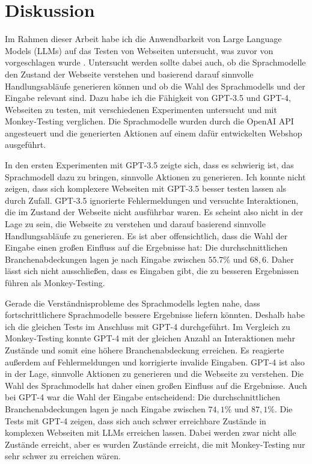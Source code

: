
\chapter{Diskussion}
\label{ch:discussion}

Im Rahmen dieser Arbeit habe ich die Anwendbarkeit von Large Language Models (LLMs) auf das Testen von Webseiten untersucht, was zuvor von \citeauthor{GPT3Testing} vorgeschlagen wurde \cite{GPT3Testing}.
Untersucht werden sollte dabei auch, ob die Sprachmodelle den Zustand der Webseite verstehen und basierend darauf sinnvolle Handlungsabläufe generieren können und ob die Wahl des Sprachmodells und der Eingabe relevant sind.
Dazu habe ich die Fähigkeit von GPT-3.5 und GPT-4, Webseiten zu testen, mit verschiedenen Experimenten untersucht und mit Monkey-Testing verglichen.
Die Sprachmodelle wurden durch die OpenAI API angesteuert und die generierten Aktionen auf einem dafür entwickelten Webshop ausgeführt.

In den ersten Experimenten mit GPT-3.5 zeigte sich, dass es schwierig ist, das Sprachmodell dazu zu bringen, sinnvolle Aktionen zu generieren.
Ich konnte nicht zeigen, dass sich komplexere Webseiten mit GPT-3.5 besser testen lassen als durch Zufall. %
GPT-3.5 ignorierte Fehlermeldungen und versuchte Interaktionen, die im Zustand der Webseite nicht ausführbar waren.
Es scheint also nicht in der Lage zu sein, die Webseite zu verstehen und darauf basierend sinnvolle Handlungsabläufe zu generieren. %
Es ist aber offensichtlich, dass die Wahl der Eingabe einen großen Einfluss auf die Ergebnisse hat: Die durchschnittlichen Branchenabdeckungen lagen je nach Eingabe zwischen $55{.}7\%$ und $68{,}6$. %
Daher lässt sich nicht ausschließen, dass es Eingaben gibt, die zu besseren Ergebnissen führen als Monkey-Testing.

Gerade die Verständnisprobleme des Sprachmodells legten nahe, dass fortschrittlichere Sprachmodelle bessere Ergebnisse liefern könnten.
Deshalb habe ich die gleichen Tests im Anschluss mit GPT-4 durchgeführt.
Im Vergleich zu Monkey-Testing konnte GPT-4 mit der gleichen Anzahl an Interaktionen mehr Zustände und somit eine höhere Branchenabdeckung erreichen. %
Es reagierte außerdem auf Fehlermeldungen und korrigierte invalide Eingaben.
GPT-4 ist also in der Lage, sinnvolle Aktionen zu generieren und die Webseite zu verstehen. %
Die Wahl des Sprachmodells hat daher einen großen Einfluss auf die Ergebnisse. %
Auch bei GPT-4 war die Wahl der Eingabe entscheidend: Die durchschnittlichen Branchenabdeckungen lagen je nach Eingabe zwischen $74{,}1\%$ und $87{,}1\%$. %
Die Tests mit GPT-4 zeigen, dass sich auch schwer erreichbare Zustände in komplexen Webseiten mit LLMs erreichen lassen.
Dabei werden zwar nicht alle Zustände erreicht, aber es wurden Zustände erreicht, die mit Monkey-Testing nur sehr schwer zu erreichen wären.

